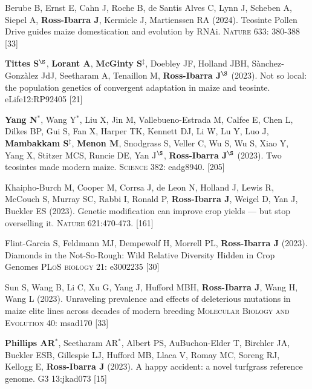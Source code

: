 \documentclass[letterpaper,10pt]{article}
\begin{document}
\begin{etaremune}
\item Berube B, Ernst E, Cahn J, Roche B, de Santis Alves C, Lynn J, Scheben A, Siepel A, \textbf{Ross-Ibarra J}, Kermicle J, Martienssen RA (2024). Teosinte Pollen Drive guides maize domestication and evolution by RNAi. \textsc{Nature} 633: 380-388 %
{} [33]\\

\item \textbf{Tittes S}$^\S$, \textbf{Lorant A}, \textbf{McGinty S}$^\ddagger$, Doebley JF,  Holland JBH, S\`{a}nchez-Gonz\`{a}lez JdJ, Seetharam A, Tenaillon M, \textbf{Ross-Ibarra J}$^\S$ (2023). Not so local: the population genetics of convergent adaptation in maize and teosinte. eLife12:RP92405 %
{} [21]\\

\item \textbf{Yang N}$^*$, Wang Y$^*$,  Liu X, Jin M, Vallebueno-Estrada M, Calfee E, Chen L, Dilkes BP, Gui S, Fan X, Harper TK, Kennett DJ, Li W, Lu Y, Luo J, \textbf{Mambakkam S}$^\ddagger$, \textbf{Menon M}, Snodgrass S, Veller C, Wu S, Wu S, Xiao Y, Yang X, Stitzer MCS, Runcie DE, Yan J$^\S$, \textbf{Ross-Ibarra J}$^\S$ (2023). Two teosintes made modern maize. \textsc{Science} 382: eadg8940.
{} [205]\\

\item Khaipho-Burch M, Cooper M, Corrsa J, de Leon N, Holland J, Lewis R, McCouch S, Murray SC, Rabbi I, Ronald P, \textbf{Ross-Ibarra J}, Weigel D, Yan J, Buckler ES (2023). Genetic modification can improve crop yields --- but stop overselling it. \textsc{Nature} 621:470-473.
{} [161]\\

\item Flint-Garcia S,  Feldmann MJ, Dempewolf H,  Morrell PL, \textbf{Ross-Ibarra J} (2023). Diamonds in the Not-So-Rough: Wild Relative Diversity Hidden in Crop Genomes \textsc{PLoS biology} 21: e3002235	
{} [30]\\

\item Sun S, Wang B, Li C, Xu G, Yang J, Hufford MBH, \textbf{Ross-Ibarra J}, Wang H, Wang L (2023). Unraveling prevalence and effects of deleterious mutations in maize elite lines across decades of modern breeding \textsc{Molecular Biology and Evolution} 40: msad170
{} [33]\\

\item \textbf{Phillips AR}$^*$, Seetharam AR$^*$, Albert PS, AuBuchon-Elder T, Birchler JA, Buckler ESB,    Gillespie LJ, Hufford MB,    Llaca V,  Romay MC,  Soreng RJ, Kellogg E, \textbf{Ross-Ibarra J} (2023). A happy accident: a novel turfgrass reference genome. \textsc{G3} 13:jkad073
{} [15]\\


\end{etaremune}
\end{document}
